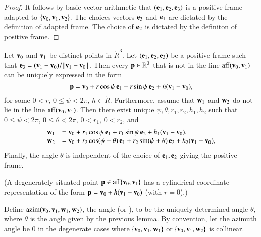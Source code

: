 \begin{proof}  It follows by basic vector arithmetic that $({\mathbf e}_1,{\mathbf e}_2,{\mathbf e}_3)$ is
a positive frame adapted to $\{{\mathbf v}_0,{\mathbf v}_1,{\mathbf v}_2\}$.  The choices vectors ${\mathbf e}_3$ and ${\mathbf e}_1$ are dictated by the definition of adapted frame.  The choice of ${\mathbf e}_2$ is dictated
by the definiton of positive frame.
\end{proof}

\begin{lemma}
Let ${\mathbf v}_0$ and ${\mathbf v}_1$ be distinct points in 
$\ring{R}^3$.  Let $({\mathbf e}_1,{\mathbf e}_2,{\mathbf e}_3)$ be a positive frame 
such that ${\mathbf e}_3 = ({\mathbf v}_1-{\mathbf v}_0)/{\hskip0.1em|\hskip-0.15em|\hskip0.1em}{\mathbf v}_1 - {\mathbf v}_0{\hskip0.1em|\hskip-0.15em|\hskip0.1em}$.
Then every
${\mathbf p}\in\mathbb{R}^3$ that is not in the line ${\operatorname{aff}}({\mathbf v}_0,{\mathbf v}_1)$
can be uniquely expressed in the form
   $$
   {\mathbf p} = {\mathbf v}_0 + r\cos\psi\, {\mathbf e}_1 + r\sin\psi\, {\mathbf e}_2 + h ({\mathbf v}_1-{\mathbf v}_0),
   $$
%
%
for some $0< r$, $0\le \psi < 2\pi$, $h\in\ring{R}$.
Furthermore,
assume that ${\mathbf w}_1$ and ${\mathbf w}_2$ do
not lie in the line ${\operatorname{aff}}({\mathbf v}_0,{\mathbf v}_1)$.
Then there exist unique $\psi,\theta,r_1,r_2,h_1,h_2$
 such
that $0\le\psi<2\pi$, $0\le\theta < 2\pi$, $0 < r_1$, $0 < r_2$, and
  $$
  \begin{array}{lll}
    {\mathbf w}_1 &= {\mathbf v}_0 + r_1\cos\psi\, {\mathbf e}_1 + r_1\sin\psi\, {\mathbf e}_2 + h_1({\mathbf v}_1-{\mathbf v}_0),\\
    {\mathbf w}_2 &= {\mathbf v}_0 + r_2\cos(\psi+\theta)\, {\mathbf e}_1 + r_2\sin(\psi+\theta)\, {\mathbf e}_2 
     + h_2({\mathbf v}_1-{\mathbf v}_0),\\
\end{array}
  $$
Finally, the angle $\theta$ is independent of the choice of ${\mathbf e}_1,{\mathbf e}_2$
giving the positive frame.
\end{lemma}
%
%
%
%
%
%
(A degenerately situated point ${\mathbf p}\in{\operatorname{aff}}\{{\mathbf v}_0,{\mathbf v}_1\}$ has a cylindrical coordinate
representation of the form ${\mathbf p} = {\mathbf v}_0 + h({\mathbf v}_1-{\mathbf v}_0)$ (with $r=0$).)


%

\begin{definition}[azim] 
Define ${\operatorname{azim}}({\mathbf v}_0,{\mathbf v}_1,{\mathbf w}_1,{\mathbf w}_2)$, the  angle (or ), 
to be the uniquely determined
angle $\theta$, where $\theta$ is the angle given by the previous
lemma.  By convention, let the azimuth angle be $0$ in the degenerate cases where
$\{{\mathbf v}_0,{\mathbf v}_1,{\mathbf w}_1\}$ or $\{{\mathbf v}_0,{\mathbf v}_1,{\mathbf w}_2\}$ is collinear.
%
%
%
\end{definition}

